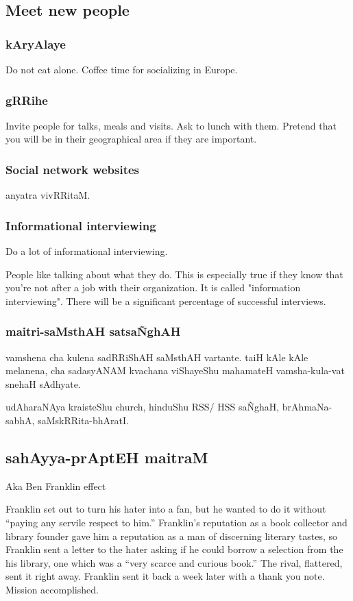 \documentclass[oneside, article]{memoir}
\begin{document}
\subsection{Meet new people}
\subsubsection{kAryAlaye}
\subitem Do not eat alone.
\subitem Coffee time for socializing in Europe.

\subsubsection{gRRihe}
\subitem Invite people for talks, meals and visits. Ask to lunch with them. Pretend that you will be in their geographical area if they are important.

\subsubsection{Social network websites}
anyatra vivRRitaM.

\subsubsection{Informational interviewing}
Do a lot of informational interviewing.

People like talking about what they do. This is especially true if they know that you're not after a job with their organization. It is called "information interviewing". There will be a significant percentage of successful interviews.

\subsubsection{maitri-saMsthAH satsa\~NghAH}
vamshena cha kulena sadRRiShAH saMsthAH vartante. taiH kAle kAle melanena, cha sadasyANAM kvachana viShayeShu mahamateH vamsha-kula-vat snehaH sAdhyate.

udAharaNAya kraisteShu church, hinduShu RSS/ HSS sa\~NghaH, brAhmaNa-sabhA, saMskRRita-bhAratI.

\subsection{sahAyya-prAptEH maitraM}
Aka Ben Franklin effect

Franklin set out to turn his hater into a fan, but he wanted to do it without “paying any servile respect to him.” Franklin’s reputation as a book collector and library founder gave him a reputation as a man of discerning literary tastes, so Franklin sent a letter to the hater asking if he could borrow a selection from the his library, one which was a “very scarce and curious book.” The rival, flattered, sent it right away. Franklin sent it back a week later with a thank you note. Mission accomplished.
\end{document}
